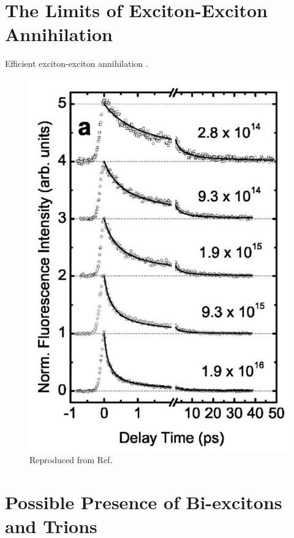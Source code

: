 \section{The Limits of Exciton-Exciton Annihilation}

Efficient exciton-exciton annihilation \cite{murakami2009existence}.

\begin{figure}[h]
	\centering
	\includegraphics[scale=0.4]{images/chapter_prior_works/pl_valkunas}
	\caption{Reproduced from Ref.\ \cite{valkunas2006exciton}}
\end{figure}


\section{Possible Presence of Bi-excitons and Trions}

